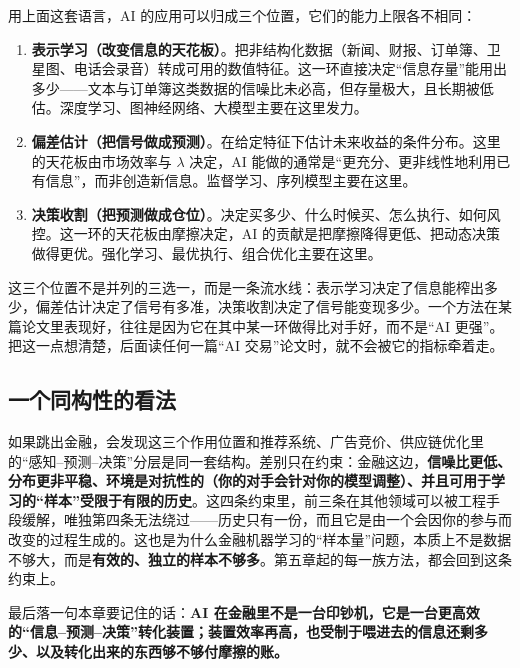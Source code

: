用上面这套语言，AI 的应用可以归成三个位置，它们的能力上限各不相同：

\begin{enumerate}
  \item \textbf{表示学习（改变信息的天花板）}。把非结构化数据（新闻、财报、订单簿、卫星图、电话会录音）转成可用的数值特征。这一环直接决定“信息存量”能用出多少——文本与订单簿这类数据的信噪比未必高，但存量极大，且长期被低估。深度学习、图神经网络、大模型主要在这里发力。
  \item \textbf{偏差估计（把信号做成预测）}。在给定特征下估计未来收益的条件分布。这里的天花板由市场效率与 $\lambda$ 决定，AI 能做的通常是“更充分、更非线性地利用已有信息”，而非创造新信息。监督学习、序列模型主要在这里。
  \item \textbf{决策收割（把预测做成仓位）}。决定买多少、什么时候买、怎么执行、如何风控。这一环的天花板由摩擦决定，AI 的贡献是把摩擦降得更低、把动态决策做得更优。强化学习、最优执行、组合优化主要在这里。
\end{enumerate}

这三个位置不是并列的三选一，而是一条流水线：表示学习决定了信息能榨出多少，偏差估计决定了信号有多准，决策收割决定了信号能变现多少。一个方法在某篇论文里表现好，往往是因为它在其中某一环做得比对手好，而不是“AI 更强”。把这一点想清楚，后面读任何一篇“AI 交易”论文时，就不会被它的指标牵着走。

\subsection{一个同构性的看法}

如果跳出金融，会发现这三个作用位置和推荐系统、广告竞价、供应链优化里的“感知--预测--决策”分层是同一套结构。差别只在约束：金融这边，\textbf{信噪比更低、分布更非平稳、环境是对抗性的（你的对手会针对你的模型调整）、并且可用于学习的“样本”受限于有限的历史}。这四条约束里，前三条在其他领域可以被工程手段缓解，唯独第四条无法绕过——历史只有一份，而且它是由一个会因你的参与而改变的过程生成的。这也是为什么金融机器学习的“样本量”问题，本质上不是数据不够大，而是\textbf{有效的、独立的样本不够多}。第五章起的每一族方法，都会回到这条约束上。

最后落一句本章要记住的话：\textbf{AI 在金融里不是一台印钞机，它是一台更高效的“信息--预测--决策”转化装置；装置效率再高，也受制于喂进去的信息还剩多少、以及转化出来的东西够不够付摩擦的账。}

